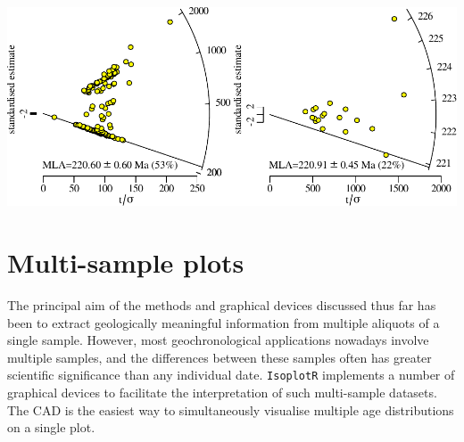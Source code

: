 \begin{refsection}
\begin{center}
\noindent\includegraphics[width=\linewidth]{../figures/297.pdf}
  \label{fig:297}
\end{center}

\section{Multi-sample plots}

The principal aim of the methods and graphical devices discussed thus
far has been to extract geologically meaningful information from
multiple aliquots of a single sample. However, most geochronological
applications nowadays involve multiple samples, and the differences
between these samples often has greater scientific significance than
any individual date.  \texttt{IsoplotR} implements a number of
graphical devices to facilitate the interpretation of such
multi-sample datasets. The CAD is the easiest way to simultaneously
visualise multiple age distributions on a single plot.


\end{refsection}
